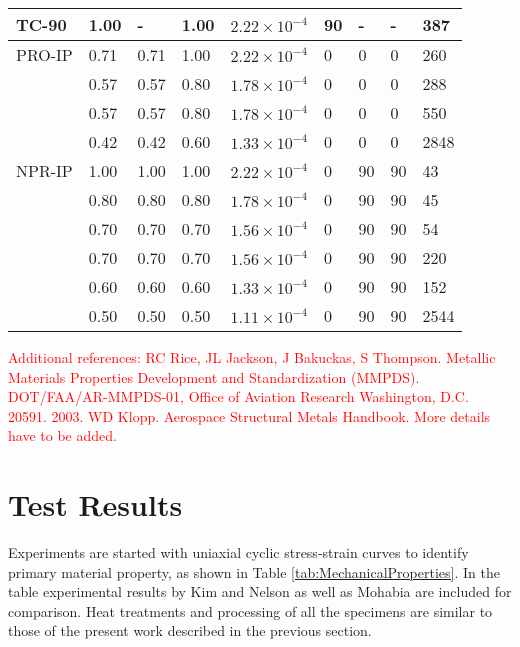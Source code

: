 \documentclass[preprint,5p,twocolumn,11pt,sort&compress]{elsarticle}
\newcommand{\marked}[1]{\textcolor{red}{#1}}
\begin{document}
\begin{table*}[htbp]
\begin{tabular}{p{2cm}p{1.5cm}p{1.5cm}p{1.5cm}p{2.5cm}p{1cm}p{1cm}p{1cm}p{1cm}}
    \hline
    TC-90 & 1.00  & -     & 1.00  & $2.22\times 10^{-4}$ & 90    & -     & -     & 387 \\
    \hline
    PRO-IP & 0.71  & 0.71  & 1.00  & $2.22\times 10^{-4}$ & 0     & 0     & 0     & 260 \\
          & 0.57  & 0.57  & 0.80  & $1.78\times 10^{-4}$ & 0     & 0     & 0     & 288 \\
          & 0.57  & 0.57  & 0.80  & $1.78\times 10^{-4}$ & 0     & 0     & 0     & 550 \\
          & 0.42  & 0.42  & 0.60  & $1.33\times 10^{-4}$ & 0     & 0     & 0     & 2848 \\
    \hline
    NPR-IP & 1.00  & 1.00  & 1.00  & $2.22\times 10^{-4}$ & 0     & 90    & 90    & 43 \\
          & 0.80  & 0.80  & 0.80  & $1.78\times 10^{-4}$ & 0     & 90    & 90    & 45 \\
          & 0.70  & 0.70  & 0.70  & $1.56\times 10^{-4}$ & 0     & 90    & 90    & 54 \\
          & 0.70  & 0.70  & 0.70  & $1.56\times 10^{-4}$ & 0     & 90    & 90    & 220 \\
          & 0.60  & 0.60  & 0.60  & $1.33\times 10^{-4}$ & 0     & 90    & 90    & 152 \\
          & 0.50  & 0.50  & 0.50  & $1.11\times 10^{-4}$ & 0     & 90    & 90    & 2544 \\
    \hline
    \end{tabular}%
  \label{Tab:TestMatrix}%
\end{table*}%


\marked{Additional references:
RC Rice, JL Jackson, J Bakuckas, S Thompson.
Metallic Materials Properties
Development and Standardization
(MMPDS). DOT/FAA/AR-MMPDS-01, Office of Aviation Research
Washington, D.C. 20591. 2003.
\newline
WD Klopp. Aerospace Structural Metals Handbook. More details have to be added.}




\section{ Test Results}
Experiments are started with uniaxial cyclic stress-strain curves to identify primary material property, as shown in Table \ref{tab:MechanicalProperties}. In the table experimental results by Kim \cite{kim1988elevated} and Nelson  \cite{nelson1992creep} as well as Mohabia \cite{Mahobia2014}  are included for comparison.
Heat treatments and processing of all the specimens are similar to those of the present work described in the previous section.
\end{document}
